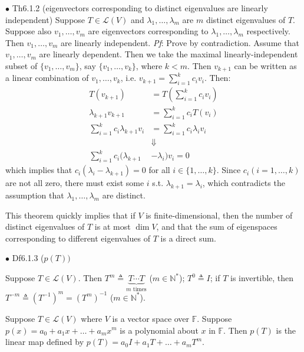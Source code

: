 \documentclass{article}
\begin{document}
\begin{Th}{$\bullet$ Th6.1.2 (eigenvectors corresponding to distinct eigenvalues are linearly independent)}
    Suppose $T\in\mathcal{L}(V)$ and $\lambda_1, \dots, \lambda_m$ are $m$ distinct eigenvalues of $T$. Suppose also $v_1,\dots, v_m$ are eigenvectors corresponding to $\lambda_1, \dots, \lambda_m$ respectively. Then $v_1, \dots, v_m$ are linearly independent.
    \tcblower
    \textit{Pf}: Prove by contradiction. Assume that $v_1, \dots, v_m$ are linearly dependent. Then we take the maximal linearly-independent subset of $\{v_1, \dots, v_m\}$, say $\{v_1, \dots, v_k\}$, where $k<m$. Then $v_{k+1}$ can be written as a linear combination of $v_1, \dots, v_k$, i.e. $v_{k+1}=\sum_{i=1}^k c_iv_i$. Then: 
    $$\begin{aligned}
        T(v_{k+1}) &= T\left(\sum_{i=1}^k c_iv_i\right)\\
        \lambda_{k+1}v_{k+1} &= \sum_{i=1}^k c_iT(v_i) \\
        \sum_{i=1}^{k} c_i\lambda_{k+1} v_i &= \sum_{i=1}^k c_i\lambda_iv_i\\
        &\Downarrow\\
        \sum_{i=1}^{k} c_i(\lambda_{k+1}&-\lambda_i)v_i = 0
    \end{aligned} 
    $$
    which implies that $c_i(\lambda_i-\lambda_{k+1})=0$ for all $i\in\{1,\dots, k\}$. Since $c_i (i=1,\dots, k)$ are not all zero, there must exist some $i$ s.t. $\lambda_{k+1}=\lambda_i$, which contradicts the assumption that $\lambda_1, \dots, \lambda_m$ are distinct.
\end{Th}

\begin{Rmk}{}
    This theorem quickly implies that \textcolor{Th}{if $V$ is finite-dimensional, then the number of distinct eigenvalues of $T$ is at most $\dim V$}, and that \textcolor{Th}{the sum of eigenspaces corresponding to different eigenvalues of $T$ is a direct sum}.
\end{Rmk}

\begin{Df}{$\bullet$ Df6.1.3 ($p(T))$}
    \begin{compactenum}
        \item Suppose $T\in\mathcal{L}(V)$. Then $T^m\triangleq \underbrace{T\cdots T}_{m\text{ times}}$ ($m\in\mathbb{N}^\ast$); $T^0\triangleq I$; if $T$ is invertible, then $T^{-m}\triangleq (T^{-1})^m = (T^m)^{-1}$ ($m\in\mathbb{N}^\ast$).
        \item Suppose $T\in\mathcal{L}(V)$ where $V$ is a vector space over $\mathbb{F}$. Suppose $p(x)=a_0+a_1x+\dots+a_mx^m$ is a polynomial about $x$ in $\mathbb{F}$. Then $p(T)$ is the linear map defined by $p(T)=a_0I+a_1T+\dots+a_mT^m$.
    \end{compactenum}
\end{Df}
\end{document}
